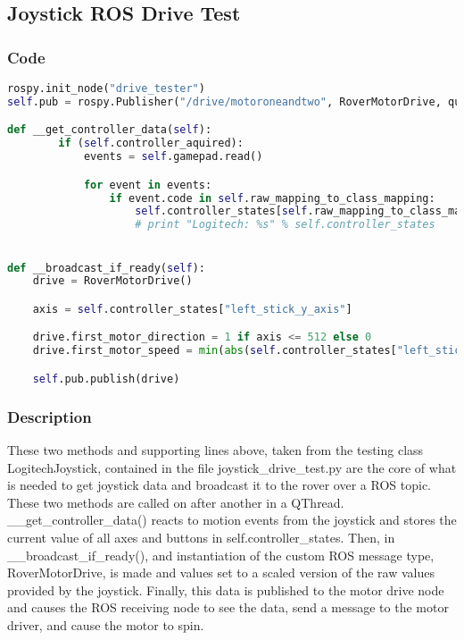 \subsection{Joystick ROS Drive Test}
\subsubsection{Code}
\begin{lstlisting}[language=python]
rospy.init_node("drive_tester")
self.pub = rospy.Publisher("/drive/motoroneandtwo", RoverMotorDrive, queue_size=1)

def __get_controller_data(self):
        if (self.controller_aquired):
            events = self.gamepad.read()

            for event in events:
                if event.code in self.raw_mapping_to_class_mapping:
                    self.controller_states[self.raw_mapping_to_class_mapping[event.code]] = event.state
                    # print "Logitech: %s" % self.controller_states


def __broadcast_if_ready(self):
	drive = RoverMotorDrive()

	axis = self.controller_states["left_stick_y_axis"]

	drive.first_motor_direction = 1 if axis <= 512 else 0
	drive.first_motor_speed = min(abs(self.controller_states["left_stick_y_axis"] - 512) * 128, 65535)

	self.pub.publish(drive)
\end{lstlisting}

\subsubsection{Description}
These two methods and supporting lines above, taken from the testing class LogitechJoystick, contained in the file joystick\_drive\_test.py are the core of what is needed to get joystick data and broadcast it to the rover over a ROS topic.
These two methods are called on after another in a QThread. \_\_get\_controller\_data() reacts to motion events from the joystick and stores the current value of all axes and buttons in self.controller\_states. Then, in \_\_broadcast\_if\_ready(), and instantiation of the custom ROS message type, RoverMotorDrive, is made and values set to a scaled version of the raw values provided by the joystick. Finally, this data is published to the motor drive node and causes the ROS receiving node to see the data, send a message to the motor driver, and cause the motor to spin.

